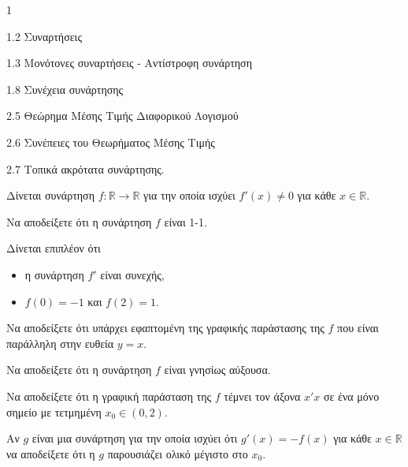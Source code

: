\begin{ylh}{1}
    \item 1.2 Συναρτήσεις
    \item 1.3 Μονότονες συναρτήσεις - Αντίστροφη συνάρτηση
    \item 1.8 Συνέχεια συνάρτησης
    \item 2.5 Θεώρημα Μέσης Τιμής Διαφορικού Λογισμού
    \item 2.6 Συνέπειες του Θεωρήματος Μέσης Τιμής
    \item 2.7 Τοπικά ακρότατα συνάρτησης.
\end{ylh}
Δίνεται συνάρτηση $f : \mathbb{R} \to \mathbb{R}$ για την οποία ισχύει $f'(x) \neq 0$ για κάθε $x \in \mathbb{R}$.

\begin{alist}
\item Να αποδείξετε ότι η συνάρτηση $f$ είναι 1-1. 

Δίνεται επιπλέον ότι
\begin{itemize}
    \item η συνάρτηση $f'$ είναι συνεχής,
    \item $f(0) = -1$ και $f(2) = 1$.
\end{itemize}

\item Να αποδείξετε ότι υπάρχει εφαπτομένη της γραφικής παράστασης της $f$ που είναι παράλληλη στην ευθεία $y=x$. 

\item
\begin{rlist}
    \item Να αποδείξετε ότι η συνάρτηση $f$ είναι γνησίως αύξουσα. 
    \item Να αποδείξετε ότι η γραφική παράσταση της $f$ τέμνει τον άξονα $x'x$ σε ένα μόνο σημείο με τετμημένη $x_0 \in (0,2)$. 
\end{rlist}

\item Αν $g$ είναι μια συνάρτηση για την οποία ισχύει ότι $g'(x) = -f(x)$ για κάθε $x \in \mathbb{R}$ να αποδείξετε ότι η $g$ παρουσιάζει ολικό μέγιστο στο $x_0$. 
\end{alist}